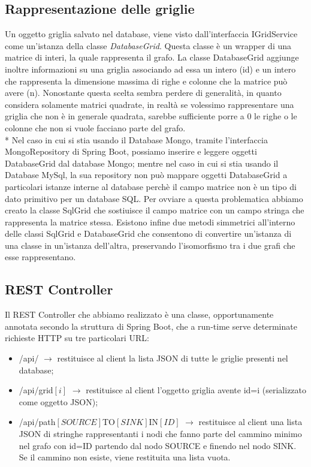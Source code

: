 \subsection{Rappresentazione delle griglie}
Un oggetto griglia salvato nel database, viene visto dall'interfaccia IGridService come un'istanza della classe \emph{DatabaseGrid}. Questa classe \`e un wrapper di una matrice di interi, la quale rappresenta il grafo. La classe DatabaseGrid aggiunge inoltre informazioni su una griglia associando ad essa un intero (id) e un intero che rappresenta la dimensione massima di righe e colonne che la matrice pu\`o avere (n). 
Nonostante questa scelta sembra perdere di generalit\`a, in quanto considera solamente matrici quadrate, in realt\`a se volessimo rappresentare una griglia che non \`e in generale quadrata, sarebbe sufficiente porre a 0 le righe o le colonne che non si vuole facciano parte del grafo.\\*
Nel caso in cui si stia usando il Database Mongo, tramite l'interfaccia MongoRepository di Spring Boot, possiamo inserire e leggere oggetti DatabaseGrid dal database Mongo; mentre nel caso in cui si stia usando il Database MySql, la sua repository non pu\`o mappare oggetti DatabaseGrid a particolari istanze interne al database perch\`e il campo matrice non \`e un tipo di dato primitivo per un database SQL. Per ovviare a questa problematica abbiamo creato la classe SqlGrid che sostiuisce il campo matrice con un campo stringa che rappresenta la matrice stessa. Esistono infine due metodi simmetrici all'interno delle classi SqlGrid e DatabaseGrid che consentono di convertire un'istanza di una classe in un'istanza dell'altra, preservando l'isomorfismo tra i due grafi che esse rappresentano.
\subsection{REST Controller}
Il REST Controller che abbiamo realizzato \`e una classe, opportunamente annotata secondo la struttura di Spring Boot, che a run-time serve determinate richieste HTTP su tre particolari URL:
\begin{itemize}
	\item /api/ $\rightarrow$ restituisce al client la lista JSON di tutte le griglie presenti nel database;
	\item /api/grid$[i]$ $\rightarrow$ restituisce al client l'oggetto griglia avente id=i  (serializzato come oggetto JSON);
	\item /api/path$[SOURCE]$TO$[SINK]$IN$[ID]$ $\rightarrow$ restituisce al client una lista JSON di stringhe rappresentanti i nodi che fanno parte del cammino minimo nel grafo con id=ID partendo dal nodo SOURCE e finendo nel nodo SINK. Se il cammino non esiste, viene restituita una lista vuota.
\end{itemize}
